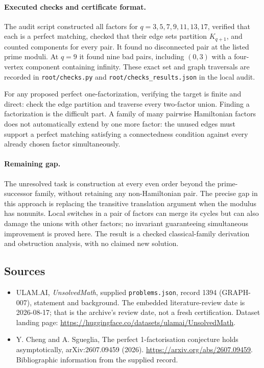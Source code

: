 \documentclass[11pt,a4paper]{article}
\begin{document}
\paragraph{Executed checks and certificate format.}
The audit script constructed all factors for $q=3,5,7,9,11,13,17$, verified that each is a perfect matching, checked that their edge sets partition $K_{q+1}$, and counted components for every pair. It found no disconnected pair at the listed prime moduli. At $q=9$ it found nine bad pairs, including $(0,3)$ with a four-vertex component containing infinity. These exact set and graph traversals are recorded in \texttt{root/checks.py} and \texttt{root/checks\_results.json} in the local audit.

For any proposed perfect one-factorization, verifying the target is finite and direct: check the edge partition and traverse every two-factor union. Finding a factorization is the difficult part. A family of many pairwise Hamiltonian factors does not automatically extend by one more factor: the unused edges must support a perfect matching satisfying a connectedness condition against every already chosen factor simultaneously.

\paragraph{Remaining gap.}
The unresolved task is construction at every even order beyond the prime-successor family, without retaining any non-Hamiltonian pair. The precise gap in this approach is replacing the transitive translation argument when the modulus has nonunits. Local switches in a pair of factors can merge its cycles but can also damage the unions with other factors; no invariant guaranteeing simultaneous improvement is proved here. The result is a checked classical-family derivation and obstruction analysis, with no claimed new solution.

\subsection{Sources}

{\small

\begin{itemize}

\item[\hypertarget{source:1394:1}{S1}] ULAM.AI, \emph{UnsolvedMath}, supplied \texttt{problems.json}, record 1394 (GRAPH-007), statement and background. The embedded literature-review date is 2026-08-17; that is the archive’s review date, not a fresh certification. Dataset landing page: \url{https://huggingface.co/datasets/ulamai/UnsolvedMath}.

\item[\hypertarget{source:1394:2}{S2}] Y. Cheng and A. Sgueglia, The perfect 1-factorisation conjecture holds asymptotically, arXiv:2607.09459 (2026). \url{https://arxiv.org/abs/2607.09459}. Bibliographic information from the supplied record.

\end{itemize}

}

\label{end:1394}
\end{document}
